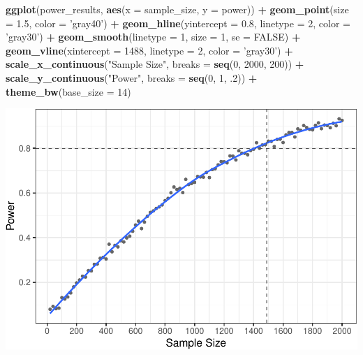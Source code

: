 \documentclass[man]{apa6}
\newenvironment{Shaded}{\begin{snugshade}}{\end{snugshade}}
\newcommand{\DataTypeTok}[1]{\textcolor[rgb]{0.13,0.29,0.53}{#1}}
\newcommand{\DecValTok}[1]{\textcolor[rgb]{0.00,0.00,0.81}{#1}}
\newcommand{\FloatTok}[1]{\textcolor[rgb]{0.00,0.00,0.81}{#1}}
\newcommand{\KeywordTok}[1]{\textcolor[rgb]{0.13,0.29,0.53}{\textbf{#1}}}
\newcommand{\NormalTok}[1]{#1}
\newcommand{\OperatorTok}[1]{\textcolor[rgb]{0.81,0.36,0.00}{\textbf{#1}}}
\newcommand{\OtherTok}[1]{\textcolor[rgb]{0.56,0.35,0.01}{#1}}
\newcommand{\StringTok}[1]{\textcolor[rgb]{0.31,0.60,0.02}{#1}}
\begin{document}
\begin{Shaded}
\begin{Highlighting}[]
\KeywordTok{ggplot}\NormalTok{(power_results, }\KeywordTok{aes}\NormalTok{(}\DataTypeTok{x =}\NormalTok{ sample_size, }\DataTypeTok{y =}\NormalTok{ power)) }\OperatorTok{+}\StringTok{ }
\StringTok{  }\KeywordTok{geom_point}\NormalTok{(}\DataTypeTok{size =} \FloatTok{1.5}\NormalTok{, }\DataTypeTok{color =} \StringTok{'gray40'}\NormalTok{) }\OperatorTok{+}\StringTok{ }
\StringTok{  }\KeywordTok{geom_hline}\NormalTok{(}\DataTypeTok{yintercept =} \FloatTok{0.8}\NormalTok{, }\DataTypeTok{linetype =} \DecValTok{2}\NormalTok{, }\DataTypeTok{color =} \StringTok{'gray30'}\NormalTok{) }\OperatorTok{+}\StringTok{ }
\StringTok{  }\KeywordTok{geom_smooth}\NormalTok{(}\DataTypeTok{linetype =} \DecValTok{1}\NormalTok{, }\DataTypeTok{size =} \DecValTok{1}\NormalTok{, }\DataTypeTok{se =} \OtherTok{FALSE}\NormalTok{) }\OperatorTok{+}
\StringTok{  }\KeywordTok{geom_vline}\NormalTok{(}\DataTypeTok{xintercept =} \DecValTok{1488}\NormalTok{, }\DataTypeTok{linetype =} \DecValTok{2}\NormalTok{, }\DataTypeTok{color =} \StringTok{'gray30'}\NormalTok{) }\OperatorTok{+}
\StringTok{  }\KeywordTok{scale_x_continuous}\NormalTok{(}\StringTok{"Sample Size"}\NormalTok{, }\DataTypeTok{breaks =} \KeywordTok{seq}\NormalTok{(}\DecValTok{0}\NormalTok{, }\DecValTok{2000}\NormalTok{, }\DecValTok{200}\NormalTok{)) }\OperatorTok{+}\StringTok{ }
\StringTok{  }\KeywordTok{scale_y_continuous}\NormalTok{(}\StringTok{"Power"}\NormalTok{, }\DataTypeTok{breaks =} \KeywordTok{seq}\NormalTok{(}\DecValTok{0}\NormalTok{, }\DecValTok{1}\NormalTok{, }\FloatTok{.2}\NormalTok{)) }\OperatorTok{+}
\StringTok{  }\KeywordTok{theme_bw}\NormalTok{(}\DataTypeTok{base_size =} \DecValTok{14}\NormalTok{)}
\end{Highlighting}
\end{Shaded}

\includegraphics{power_simulation_files/figure-latex/simglm-power-curve-1.pdf}
\end{document}
